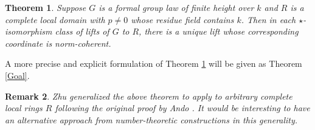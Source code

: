 \documentclass[12pt]{article}
\newtheorem{theorem}{Theorem}[section]
\newtheorem{remark}[theorem]{Remark}
\theoremstyle{definition}
\begin{document}
    \begin{theorem} \label{Not precise goal}
        Suppose $G$ is a formal group law of finite height over $k$ and $R$ is a complete local domain with $p \neq 0$ whose residue field contains $k$. Then in each $\star$-isomorphism class of lifts of $G$ to $R$, there is a unique lift whose corresponding coordinate is norm-coherent. 
    \end{theorem}
    A more precise and explicit formulation of Theorem \ref{Not precise goal} will be given as Theorem \ref{Goal}. 
    \begin{remark} \label{Zhu and Ando}
        Zhu generalized the above theorem to apply to arbitrary complete local rings $R$ following the original proof by Ando \cite[Theorem 1.2]{Zhu20}. It would be interesting to have an alternative approach from number-theoretic constructions in this generality. 
    \end{remark}
\end{document}
